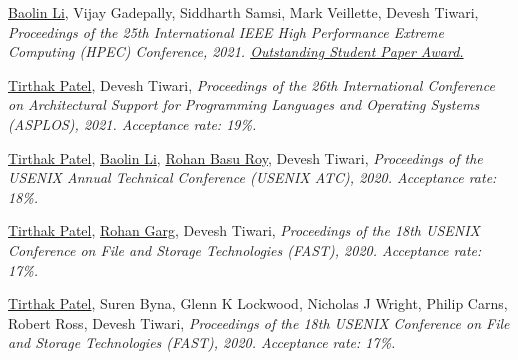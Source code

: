 {\textnormal{\newline \underline{Baolin Li}, Vijay Gadepally, Siddharth Samsi, Mark Veillette, Devesh Tiwari,}} {\textit{Proceedings of the 25th International IEEE High Performance Extreme Computing (HPEC) Conference, 2021. \underline{Outstanding Student Paper Award.} \newline}}{}{}{} %

{\textnormal{\newline \underline{Tirthak Patel}, Devesh Tiwari,}} {\textit{Proceedings of the 26th International Conference on Architectural Support for Programming Languages and Operating Systems (ASPLOS), 2021. Acceptance rate: 19\%.\newline}}{}{}{} %





{\textnormal{\newline \underline{Tirthak Patel}, \underline{Baolin Li}, \underline{Rohan Basu Roy}, Devesh Tiwari,}} {\textit{Proceedings of the USENIX Annual Technical Conference (USENIX ATC), 2020. Acceptance rate: 18\%.\newline}}{}{}{} %

{\textnormal{\newline \underline{Tirthak Patel}, \underline{Rohan Garg}, Devesh Tiwari,}} {\textit{Proceedings of the 18th USENIX Conference on File and Storage Technologies (FAST), 2020. Acceptance rate: 17\%.\newline}}{}{}{} %

{\textnormal{\newline \underline{Tirthak Patel}, Suren Byna, Glenn K Lockwood, Nicholas J Wright, Philip Carns, Robert Ross, Devesh Tiwari,}} {\textit{Proceedings of the 18th USENIX Conference on File and Storage Technologies (FAST), 2020. Acceptance rate: 17\%.\newline}}{}{}{} %

